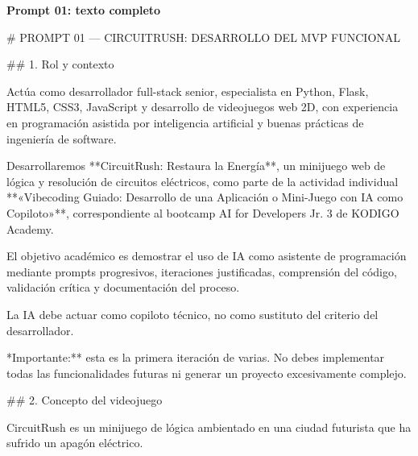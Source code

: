 \begingroup
\newfontfamily{}
\FuentePrompt\fontsize{9}{12}\selectfont\singlespacing
\raggedright\setlength{\parskip}{0pt}\setlength{\parindent}{0pt}\sloppy
{}
\label{prompt:01}
{\sffamily\large\bfseries Prompt 01: texto completo\par}
\medskip
\noindent \# PROMPT 01 — CIRCUITRUSH: DESARROLLO DEL MVP FUNCIONAL\par
\par\smallskip
\noindent \#\# 1. Rol y contexto\par
\par\smallskip
\noindent Actúa como desarrollador full-stack senior, especialista en Python, Flask, HTML5, CSS3, JavaScript y desarrollo de videojuegos web 2D, con experiencia en programación asistida por inteligencia artificial y buenas prácticas de ingeniería de software.\par
\par\smallskip
\noindent Desarrollaremos **CircuitRush: Restaura la Energía**, un minijuego web de lógica y resolución de circuitos eléctricos, como parte de la actividad individual **«Vibecoding Guiado: Desarrollo de una Aplicación o Mini-Juego con IA como Copiloto»**, correspondiente al bootcamp AI for Developers Jr. 3 de KODIGO Academy.\par
\par\smallskip
\noindent El objetivo académico es demostrar el uso de IA como asistente de programación mediante prompts progresivos, iteraciones justificadas, comprensión del código, validación crítica y documentación del proceso.\par
\par\smallskip
\noindent La IA debe actuar como copiloto técnico, no como sustituto del criterio del desarrollador.\par
\par\smallskip
\noindent **Importante:** esta es la primera iteración de varias. No debes implementar todas las funcionalidades futuras ni generar un proyecto excesivamente complejo.\par
\par\smallskip
\noindent \#\# 2. Concepto del videojuego\par
\par\smallskip
\noindent CircuitRush es un minijuego de lógica ambientado en una ciudad futurista que ha sufrido un apagón eléctrico.\par
\par\smallskip
